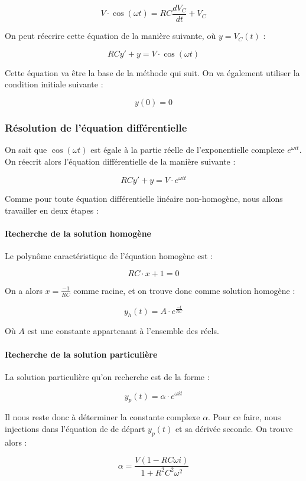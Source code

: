 $$V \cdot \cos (\omega t) = RC\frac{dV_C}{dt}  + V_C$$

On peut réecrire cette équation de la manière suivante, où $y = V_C(t)$ :

$$RCy' + y = V \cdot \cos (\omega t)$$

Cette équation va être la base de la méthode qui suit. On va également utiliser 
la condition initiale suivante :

$$y(0) = 0$$

\subsubsection{Résolution de l'équation différentielle}

On sait que $\cos (\omega t)$ est égale à la partie réelle de l'exponentielle
complexe $e^{\omega i t}$. On réecrit alors l'équation différentielle de la
manière suivante :

$$RCy' + y = V \cdot e^{\omega i t}$$

Comme pour toute équation différentielle linéaire non-homogène, nous allons travailler
en deux étapes :

\paragraph{Recherche de la solution homogène}

Le polynôme caractéristique de l'équation homogène est :

$$RC \cdot x + 1 = 0$$

On a alors $x = \frac{-1}{RC}$ comme racine, et on trouve donc comme solution homogène :

$$y_h(t) = A \cdot e^{\frac{-t}{RC}}$$

Où $A$ est une constante appartenant à l'ensemble des réels. %

\paragraph{Recherche de la solution particulière}

La solution particulière qu'on recherche est de la forme :

$$y_p(t) = \alpha \cdot e^{\omega i t}$$

Il nous reste donc à déterminer la constante complexe $\alpha$. Pour ce faire,
nous injections dans l'équation de de départ $y_p(t)$ et sa dérivée seconde. On
trouve alors :

$$\alpha = \frac{V(1-RC\omega i)}{1+R^2C^2\omega^2}$$

